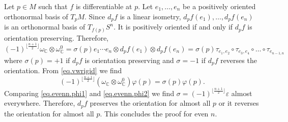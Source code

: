 \documentclass[11pt,reqno]{amsart}
\newcommand{\C}{\mathbb{C}}
\newcommand{\eps}{\varepsilon}
\renewcommand{\phi}{\varphi}
\newcommand{\<}{\langle}
\renewcommand{\>}{\rangle}
\theoremstyle{definition}
\begin{document}
Let $p\in M$ such that $f$ is differentiable at $p$.
Let $e_1,\dots,e_n$ be a positively oriented orthonormal basis of $T_pM$.
Since $d_pf$ is a linear isometry, $d_pf(e_1),\dots,d_pf(e_n)$ is an orthonormal basis of $T_{f(p)}S^n$.
It is positively oriented if and only if $d_pf$ is orientation preserving. 
Therefore,
$$
(-1)^{\lfloor \frac{n+1}{2}\rfloor}\omega_\C \otimes \omega_\C^0 
= 
\sigma(p) e_1\cdots e_n\otimes d_pf(e_1) \otimes d_pf(e_n)
=
\sigma(p) \tau_{e_1,e_2}\circ \tau_{e_3,e_4}\circ \dots \circ \tau_{e_{n-1,n}}
$$
where $\sigma(p)=+1$ if $d_pf$ is orientation preserving and $\sigma=-1$ if $d_pf$ reverses the orientation.
From \eqref{eq.vwrigid} we find
\begin{equation}
(-1)^{\lfloor \frac{n+1}{2}\rfloor}(\omega_\C\otimes \omega_\C^0)\phi(p) = \sigma(p) \phi(p).
\label{eq.evenn.phi2}
\end{equation}
Comparing \eqref{eq.evenn.phi1} and \eqref{eq.evenn.phi2} we find $\sigma=(-1)^{\lfloor \frac{n+1}{2}\rfloor}\eps$ almost everywhere.
Therefore, $d_pf$ preserves the orientation for almost all $p$ or it reverses the orientation for almost all $p$.
This concludes the proof for even $n$.
\end{document}
